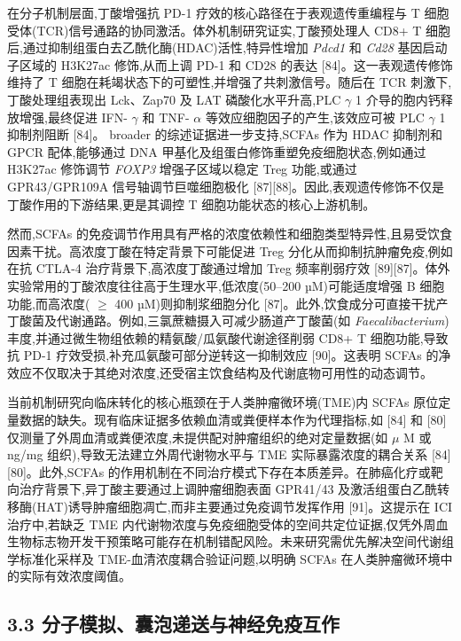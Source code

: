 \documentclass[11pt]{article}
\begin{document}
在分子机制层面,丁酸增强抗 PD-1 疗效的核心路径在于表观遗传重编程与 T 细胞受体(TCR)信号通路的协同激活。体外机制研究证实,丁酸预处理人 CD8+ T 细胞后,通过抑制组蛋白去乙酰化酶(HDAC)活性,特异性增加 \emph{Pdcd1} 和 \emph{Cd28} 基因启动子区域的 H3K27ac 修饰,从而上调 PD-1 和 CD28 的表达 {[}84{]}。这一表观遗传修饰维持了 T 细胞在耗竭状态下的可塑性,并增强了共刺激信号。随后在 TCR 刺激下,丁酸处理组表现出 Lck、Zap70 及 LAT 磷酸化水平升高,PLC \(\gamma\) 1 介导的胞内钙释放增强,最终促进 IFN- \(\gamma\) 和 TNF- \(\alpha\) 等效应细胞因子的产生,该效应可被 PLC \(\gamma\) 1 抑制剂阻断 {[}84{]}。 broader 的综述证据进一步支持,SCFAs 作为 HDAC 抑制剂和 GPCR 配体,能够通过 DNA 甲基化及组蛋白修饰重塑免疫细胞状态,例如通过 H3K27ac 修饰调节 \emph{FOXP3} 增强子区域以稳定 Treg 功能,或通过 GPR43/GPR109A 信号轴调节巨噬细胞极化 {[}87{]}{[}88{]}。因此,表观遗传修饰不仅是丁酸作用的下游结果,更是其调控 T 细胞功能状态的核心上游机制。

然而,SCFAs 的免疫调节作用具有严格的浓度依赖性和细胞类型特异性,且易受饮食因素干扰。高浓度丁酸在特定背景下可能促进 Treg 分化从而抑制抗肿瘤免疫,例如在抗 CTLA-4 治疗背景下,高浓度丁酸通过增加 Treg 频率削弱疗效 {[}89{]}{[}87{]}。体外实验常用的丁酸浓度往往高于生理水平,低浓度(50--200 µM)可能适度增强 B 细胞功能,而高浓度( \(\geq\) 400 µM)则抑制浆细胞分化 {[}87{]}。此外,饮食成分可直接干扰产丁酸菌及代谢通路。例如,三氯蔗糖摄入可减少肠道产丁酸菌(如 \emph{Faecalibacterium})丰度,并通过微生物组依赖的精氨酸/瓜氨酸代谢途径削弱 CD8+ T 细胞功能,导致抗 PD-1 疗效受损,补充瓜氨酸可部分逆转这一抑制效应 {[}90{]}。这表明 SCFAs 的净效应不仅取决于其绝对浓度,还受宿主饮食结构及代谢底物可用性的动态调节。

当前机制研究向临床转化的核心瓶颈在于人类肿瘤微环境(TME)内 SCFAs 原位定量数据的缺失。现有临床证据多依赖血清或粪便样本作为代理指标,如 {[}84{]} 和 {[}80{]} 仅测量了外周血清或粪便浓度,未提供配对肿瘤组织的绝对定量数据(如 \(\mu\) M 或 ng/mg 组织),导致无法建立外周代谢物水平与 TME 实际暴露浓度的耦合关系 {[}84{]}{[}80{]}。此外,SCFAs 的作用机制在不同治疗模式下存在本质差异。在肺癌化疗或靶向治疗背景下,异丁酸主要通过上调肿瘤细胞表面 GPR41/43 及激活组蛋白乙酰转移酶(HAT)诱导肿瘤细胞凋亡,而非主要通过免疫调节发挥作用 {[}91{]}。这提示在 ICI 治疗中,若缺乏 TME 内代谢物浓度与免疫细胞受体的空间共定位证据,仅凭外周血生物标志物开发干预策略可能存在机制错配风险。未来研究需优先解决空间代谢组学标准化采样及 TME-血清浓度耦合验证问题,以明确 SCFAs 在人类肿瘤微环境中的实际有效浓度阈值。

\subsection{3.3 分子模拟、囊泡递送与神经免疫互作}\label{ux5206ux5b50ux6a21ux62dfux56caux6ce1ux9012ux9001ux4e0eux795eux7ecfux514dux75abux4e92ux4f5c}
\end{document}
